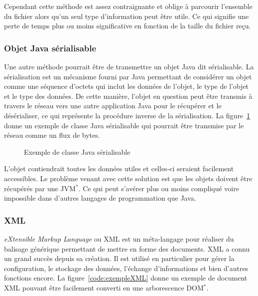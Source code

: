 Cependant cette m\'ethode est assez contraignante et oblige \`a parcourir l'ensemble du fichier alors qu'un seul type d'information peut \^etre utile.
Ce qui signifie une perte de temps plus ou moins significative en fonction de la taille du fichier re\c{c}u.

\subsubsection{Objet Java s\'erialisable}

Une autre m\'ethode pourrait \^etre de transmettre un objet Java dit s\'erialisable.
La s\'erialisation est un m\'ecanisme fourni par Java permettant de consid\'erer un objet comme une s\'equence d'octets qui inclut les donn\'ees de l'objet, le type de l'objet et le type des donn\'ees.
De cette mani\`ere, l'objet en question peut \^etre transmis \`a travers le r\'eseau vers une autre application Java pour le r\'ecup\'erer et le d\'es\'erialiser, ce qui repr\'esente la proc\'edure inverse de la s\'erialisation.
La figure~\ref{code:exempleJava} donne un exemple de classe Java s\'erialisable qui pourrait \^etre transmise par le r\'eseau comme un flux de bytes.

\vspace{0.20cm}

\begin{figure}[!ht]
	
	\caption{Exemple de classe Java s\'erialisable}
	\label{code:exempleJava}

\end{figure}

L'objet contiendrait toutes les donn\'ees utiles et celles-ci seraient facilement accessibles.
Le probl\`eme venant avec cette solution est que les objets doivent \^etre r\'ecup\'er\'es par une JVM$^*$.
Ce qui peut s'av\'erer plus ou moins compliqu\'e voire impossible dans d'autres langages de programmation que Java.

\subsubsection{XML}

\textit{eXtensible Markup Language} ou XML est un m\'eta-langage pour r\'ealiser du balisage g\'en\'erique permettant de mettre en forme des documents. XML a connu un grand succ\`es depuis sa cr\'eation.
Il est utilis\'e en particulier pour g\'erer la configuration, le stockage des donn\'ees, l'\'echange d'informations et bien d'autres fonctions encore.
La figure~\ref{code:exempleXML} donne un exemple de document XML pouvant \^etre facilement converti en une arborescence DOM$^*$.

